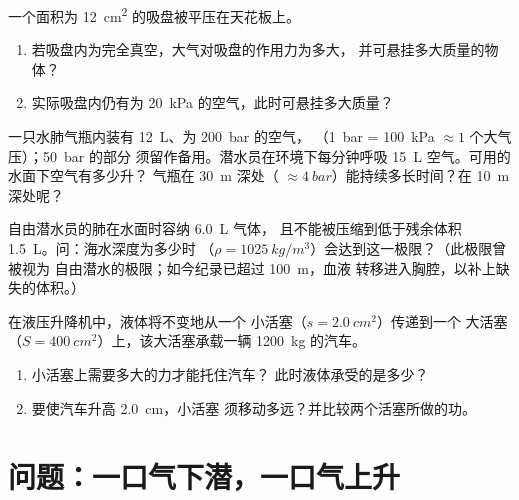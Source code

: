 \begin{exercise}[$\star\star\star$]\label{exo:g10:pressure:12}
一个面积为 \qty{12}{cm^2} 的吸盘被平压在天花板上。
\begin{enumerate}
  \item 若吸盘内为完全真空，大气对吸盘的作用力为多大，
        并可悬挂多大质量的物体？
  \item 实际吸盘内仍有为 \qty{20}{kPa} 的空气，此时可悬挂多大质量？
\end{enumerate}
\end{exercise}

\begin{exercise}[$\star\star\star$]\label{exo:g10:pressure:13}
一只水肺气瓶内装有 \qty{12}{L}、为 \qty{200}{bar} 的空气，
（\qty{1}{bar} = \qty{100}{kPa} $\approx 1$ 个大气压）；\qty{50}{bar} 的部分
须留作备用。潜水员在环境下每分钟呼吸
\qty{15}{L} 空气。可用的水面下空气有多少升？
气瓶在 \qty{30}{m} 深处（
$\approx \qty{4}{bar}$）能持续多长时间？在 \qty{10}{m} 深处呢？
\end{exercise}

\begin{exercise}[$\star\star\star$]\label{exo:g10:pressure:14}
自由潜水员的肺在水面时容纳 \qty{6.0}{L} 气体，
且不能被压缩到低于残余体积 \qty{1.5}{L}。问：海水深度为多少时
（$\rho = \qty{1025}{kg/m^3}$）会达到这一极限？（此极限曾被视为
自由潜水的极限；如今纪录已超过 \qty{100}{m}，血液
转移进入胸腔，以补上缺失的体积。）
\end{exercise}

\begin{exercise}[$\star\star\star$]\label{exo:g10:pressure:15}
在液压升降机中，液体将不变地从一个
小活塞（$s = \qty{2.0}{cm^2}$）传递到一个
大活塞（$S = \qty{400}{cm^2}$）上，该大活塞承载一辆 \qty{1200}{kg} 的汽车。
\begin{enumerate}
  \item 小活塞上需要多大的力才能托住汽车？
        此时液体承受的是多少？
  \item 要使汽车升高 \qty{2.0}{cm}，小活塞
        须移动多远？并比较两个活塞所做的功。
\end{enumerate}
\end{exercise}

\section{问题：一口气下潜，一口气上升}

